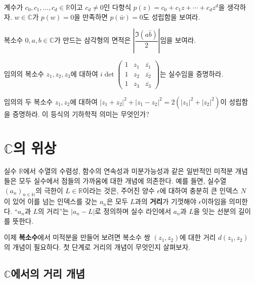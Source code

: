 \begin{salt_exercise} \label{ex-1-18}
계수가 $c_0, c_1, \ldots, c_d\in\mathbb R$이고 $c_d\ne0$인 다항식
$p(z) = c_0+c_1z+\cdots + c_dz^d$을 생각하자.
$w\in\mathbb C$가 $p(w)=0$을 만족하면 $p(\bar w)=0$도 성립함을 보여라.
\end{salt_exercise}

\begin{salt_exercise} \label{ex-1-19}
복소수 $0, a, b \in\mathbb C$가 만드는 삼각형의 면적은
$\left| \dfrac{\Im(a\bar b)}2\right|$임을 보여라.
\end{salt_exercise}

\begin{salt_exercise} \label{ex-1-20}
임의의 복소수 $z_1,z_2, z_3$에 대하여
$i\det \begin{pmatrix}
1 & z_1 & \overline{z_1} \\
1 & z_2 & \overline{z_2} \\
1 & z_3 & \overline{z_3} 
\end{pmatrix}$는 실수임을 증명하라.
\end{salt_exercise}

\begin{salt_exercise} \label{ex-1-21}
임의의 두 복소수 $z_1, z_2$에 대하여
$|z_1+z_2|^2 + |z_1-z_2|^2 =2(|z_1|^2+|z_2|^2)$이 성립함을 증명하라.
이 등식의 기하학적 의미는 무엇인가?
\end{salt_exercise}

\section{$\mathbb C$의 위상}

실수 $\mathbb R$에서 수열의 수렴성, 함수의 연속성과 미분가능성과 같은
일반적인 미적분 개념들은 모두 실수에서 점들의 가까움에 대한 개념에 의존한다.
예를 들면, 실수열 $(a_n)_{n\in\mathbb N}$의 극한이 $L\in\mathbb R$이라는 것은,
주어진 양수 $\epsilon$에 대하여 충분히 큰 인덱스 $N$이 있어 이를 넘는 인덱스를 갖는
 $a_n$은 모두 $L$과의 {\bf 거리}가 기껏해야 $\epsilon$이하임을 의미한다.
``$a_n$과  $L$의 거리''는 $|a_n-L|$로 정의하며
실수 라인에서 $a_n$과 $L$을 잇는 선분의 길이를 뜻한다.

이제 {\bf 복소수}에서 미적분을 만들어 보려면
복소수 쌍 $(z_1, z_2)$에 대한 거리 $d(z_1, z_2)$의 개념이 필요하다.
첫 단계로 거리의 개념이 무엇인지 살펴보자.

\subsection{$\mathbb C$에서의 거리 개념}

